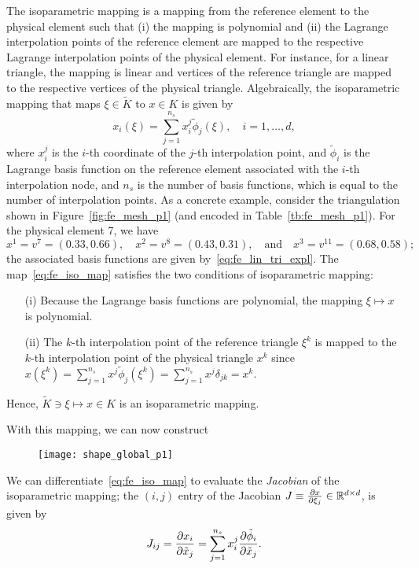 The isoparametric mapping is a mapping from the reference element to the physical element such that (i) the mapping is polynomial and (ii) the Lagrange interpolation points of the reference element are mapped to the respective Lagrange interpolation points of the physical element. For instance, for a linear triangle, the mapping is linear and vertices of the reference triangle are mapped to the respective vertices of the physical triangle.   Algebraically, the isoparametric mapping that maps $\xi \in \tilde K$ to $x \in K$ is given by
\begin{equation}
  x_i(\xi) = \sum_{j=1}^{n_s} x^j_i \tilde \phi_j(\xi), \quad i = 1,\dots,d,
  \label{eq:fe_iso_map}
\end{equation}
where $x_i^j$ is the $i$-th coordinate of the $j$-th interpolation point, and $\tilde \phi_i$ is the Lagrange basis function on the reference element associated with the $i$-th interpolation node, and $n_s$ is the number of basis functions, which is equal to the number of interpolation points.
As a concrete example, consider the triangulation shown in Figure~\ref{fig:fe_mesh_p1} (and encoded in Table~\ref{tb:fe_mesh_p1}).  For the physical element 7, we have
\begin{equation*}
  x^1 = v^7 = (0.33,0.66), \quad 
  x^2 = v^8 = (0.43,0.31), \quad \text{and} \quad
  x^3 = v^{11} = (0.68,0.58);
\end{equation*}
the associated basis functions are given by~\eqref{eq:fe_lin_tri_expl}.
The map~\eqref{eq:fe_iso_map} satisfies the two conditions of isoparametric mapping:
\begin{itemize}
\item[(i)] Because the Lagrange basis functions are polynomial, the mapping $\xi \mapsto x$ is polynomial.
\item[(ii)] The $k$-th interpolation point of the reference triangle $\xi^k$ is mapped to the $k$-th interpolation point of the physical triangle $x^k$ since $x(\xi^k) = \sum_{j=1}^{n_s} x^j \tilde \phi_j(\xi^k) = \sum_{j=1}^{n_s} x^j \delta_{jk} = x^k$.
\end{itemize}
Hence, $\tilde K \ni \xi \mapsto x \in K$ is an isoparametric mapping.

With this mapping, we can now construct 

\begin{figure}
  \centering
  \texttt{[image: shape\_global\_p1]}
\end{figure}


We can differentiate~\eqref{eq:fe_iso_map} to evaluate the \emph{Jacobian} of the isoparametric mapping; the $(i,j)$ entry of the Jacobian $J \equiv \frac{\partial x}{\partial \xi_j} \in \mathbb{R}^{d \times d}$, is given by
\begin{equation*}
  J_{ij} = \frac{\partial x_i}{\partial \tilde x_j} = \sum_{j=1}^{n_s} x^j_i \frac{\partial \tilde \phi_i}{\partial \tilde x_j} .
\end{equation*}

